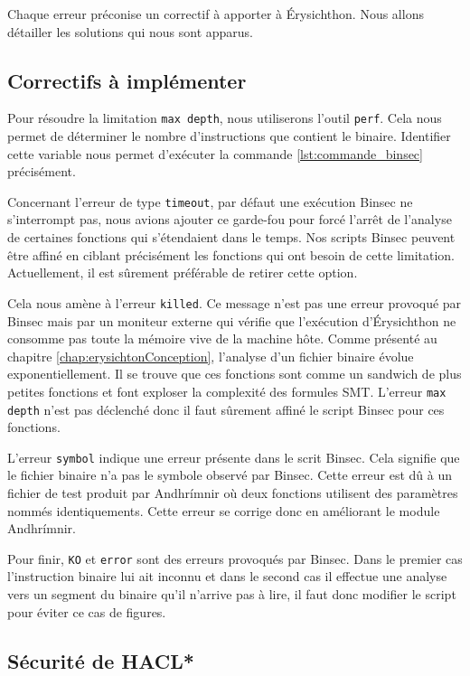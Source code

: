 Chaque erreur préconise un correctif à apporter à Érysichthon. Nous allons détailler les solutions qui nous sont apparus.

\subsection*{Correctifs à implémenter}

Pour résoudre la limitation \texttt{max depth}, nous utiliserons l'outil \texttt{perf}. Cela nous permet de déterminer le nombre d'instructions que contient le binaire. Identifier cette variable nous permet d'exécuter la commande \ref{lst:commande_binsec} précisément.\smallbreak

Concernant l'erreur de type \texttt{timeout}, par défaut une exécution Binsec ne s'interrompt pas, nous avions ajouter ce garde-fou pour forcé l'arrêt de l'analyse de certaines fonctions qui s'étendaient dans le temps. Nos scripts Binsec peuvent être affiné en ciblant précisément les fonctions qui ont besoin de cette limitation. Actuellement, il est sûrement préférable de retirer cette option.\smallbreak

Cela nous amène à l'erreur \texttt{killed}. Ce message n'est pas une erreur provoqué par Binsec mais par un moniteur externe qui vérifie que l'exécution d'Érysichthon ne consomme pas toute la mémoire vive de la machine hôte. Comme présenté au chapitre \ref{chap:erysichtonConception}, l'analyse d'un fichier binaire évolue exponentiellement. Il se trouve que ces fonctions sont comme un sandwich de plus petites fonctions et font exploser la complexité des formules SMT. L'erreur \texttt{max depth} n'est pas déclenché donc il faut sûrement affiné le script Binsec pour ces fonctions.

L'erreur \texttt{symbol} indique une erreur présente dans le scrit Binsec. Cela signifie que le fichier binaire n'a pas le symbole observé par Binsec. Cette erreur est dû à un fichier de test produit par Andhrímnir où deux fonctions utilisent des paramètres nommés identiquements. Cette erreur se corrige donc en améliorant le module Andhrímnir.

Pour finir, \texttt{KO} et \texttt{error} sont des erreurs provoqués par Binsec. Dans le premier cas l'instruction binaire lui ait inconnu et dans le second cas il effectue une analyse vers un segment du binaire qu'il n'arrive pas à lire, il faut donc modifier le script pour éviter ce cas de figures.


\subsection*{Sécurité de HACL*}

